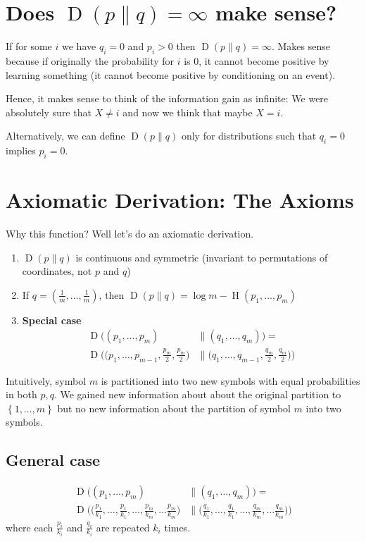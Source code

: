 \documentclass{article}
\begin{document}
\section{Does $\operatorname{D}\left(p\| q\right)=\infty$ make sense?}

If for some $i$ we have $q_i=0$ and $p_i>0$ then $\operatorname{D}\left(p\| q\right)=\infty$. Makes sense because if originally the probability for $i$ is $0$, it cannot become positive by learning something (it cannot become positive by conditioning on an event).

Hence, it makes sense to think of the information gain as infinite: We were absolutely sure that $X\neq i$ and now we think that maybe $X=i$.

Alternatively, we can define $\operatorname{D}\left(p\| q\right)$ only for distributions such that $q_i=0$ implies $p_i=0$.

\section{Axiomatic Derivation: The Axioms}

Why this function? Well let's do an axiomatic derivation.
\begin{enumerate}
    \item $\operatorname{D}\left(p\| q\right)$ is continuous and symmetric (invariant to permutations of coordinates, not $p$ and $q$)
    \item If $q=\left(\frac{1}{m},\ldots,\frac{1}{m}\right)$, then $\operatorname{D}\left(p\| q\right)=\log m -\operatorname{H}\left(p_1,\ldots,p_m\right)$
    \item \textbf{Special case} \begin{align*}
\operatorname{D}\bigl( (p_1,\ldots,p_m) &\parallel (q_1,\ldots,q_m) \bigr) = \\
\operatorname{D}\biggl( \Big(p_1,\ldots,p_{m-1},\frac{p_m}{2},\frac{p_m}{2}\Big) &\parallel \Big(q_1,\ldots,q_{m-1},\frac{q_m}{2},\frac{q_m}{2}\Big) \biggr)
\end{align*}
\end{enumerate}
Intuitively, symbol $m$ is partitioned into two new symbols with equal probabilities in both $p,q$. We gained new information about about the original partition to $\left\{1,\ldots, m\right\}$ but no new information about the partition of symbol $m$ into two symbols.

\subsection{General case}
\begin{align*}
\operatorname{D}\bigl( (p_1,\ldots,p_m) &\parallel (q_1,\ldots,q_m) \bigr) = \\
\operatorname{D}\biggl( \Big(\frac{p_1}{k_1},\ldots,\frac{p_1}{k_1},\ldots,\frac{p_m}{k_m},\ldots\frac{p_m}{k_m}\Big) &\parallel \Big(\frac{q_1}{k_1},\ldots,\frac{q_1}{k_1},\ldots,\frac{q_m}{k_m},\ldots\frac{q_m}{k_m}\Big) \biggr)
\end{align*}
where each $\frac{p_i}{k_i}$ and $\frac{q_i}{k_i}$ are repeated $k_i$ times.
\end{document}
